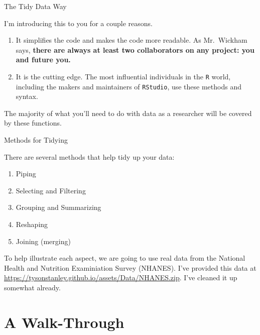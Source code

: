 \begin{frame}[fragile]{The Tidy Data Way}

I'm introducing this to you for a couple reasons.

\begin{enumerate}
\def\labelenumi{\arabic{enumi}.}
\tightlist
\item
  It simplifies the code and makes the code more readable. As
  Mr.~Wickham says, \textbf{there are always at least two collaborators
  on any project: you and future you.}
\item
  It is the cutting edge. The most influential individuals in the
  \texttt{R} world, including the makers and maintainers of
  \texttt{RStudio}, use these methods and syntax.
\end{enumerate}

The majority of what you'll need to do with data as a researcher will be
covered by these functions.

\end{frame}

\begin{frame}{Methods for Tidying}

There are several methods that help tidy up your data:

\begin{enumerate}
\def\labelenumi{\arabic{enumi}.}
\tightlist
\item
  Piping
\item
  Selecting and Filtering
\item
  Grouping and Summarizing
\item
  Reshaping
\item
  Joining (merging)
\end{enumerate}

To help illustrate each aspect, we are going to use real data from the
National Health and Nutrition Examiniation Survey (NHANES). I've
provided this data at
\url{https://tysonstanley.github.io/assets/Data/NHANES.zip}. I've
cleaned it up somewhat already.

\end{frame}

\section{A Walk-Through}\label{a-walk-through}

